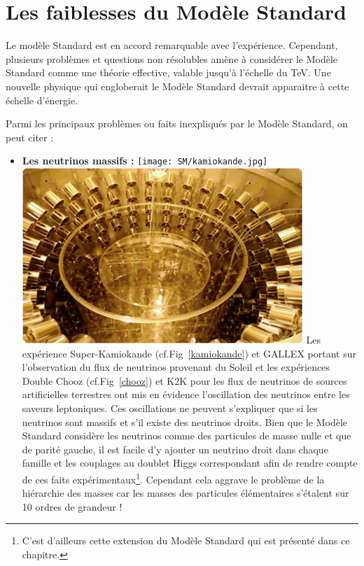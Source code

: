 \section{Les faiblesses du Modèle Standard}
Le modèle Standard est en accord remarquable avec l'expérience. Cependant, plusieurs problèmes et questions non résolubles amène à considérer le Modèle Standard comme une théorie effective, valable jusqu'à l'échelle du \si{\tera\eV}. Une nouvelle physique qui engloberait le Modèle Standard devrait apparaitre à cette échelle d'énergie.

Parmi les principaux problèmes ou faits inexpliqués par le Modèle Standard, on peut citer :
\begin{itemize}[label=$\bullet$]
\item \textbf{Les neutrinos massifs :}
\marginpar
{
\centering
\texttt{[image: SM/kamiokande.jpg]}
\label{kamiokande}
}
\marginpar
{
\centering
\includegraphics[width=\marginparwidth]{SM/chooz.jpg}
\label{chooz}
} 
Les expérience Super-Kamiokande (cf.Fig~\ref{kamiokande}) et GALLEX portant sur l'observation du flux de neutrinos provenant du Soleil et les expériences Double Chooz (cf.Fig~\ref{chooz}) et K2K pour les flux de neutrinos de sources artificielles terrestres ont mis en évidence l'oscillation des neutrinos entre les saveurs leptoniques. Ces oscillations ne peuvent s'expliquer que si les neutrinos sont massifs et s'il existe des neutrinos droits. Bien que le Modèle Standard considère les neutrinos comme des particules de masse nulle et que de parité gauche, il est facile d'y ajouter un neutrino droit dans chaque famille et les couplages au doublet Higgs correspondant afin de rendre compte de ces faits expérimentaux\footnote{C'est d'ailleurs cette extension du Modèle Standard qui est présenté dans ce chapitre.}. Cependant cela aggrave le problème de la hiérarchie des masses car les masses des particules élémentaires s'étalent sur \num{10} ordres de grandeur !


\end{itemize}
